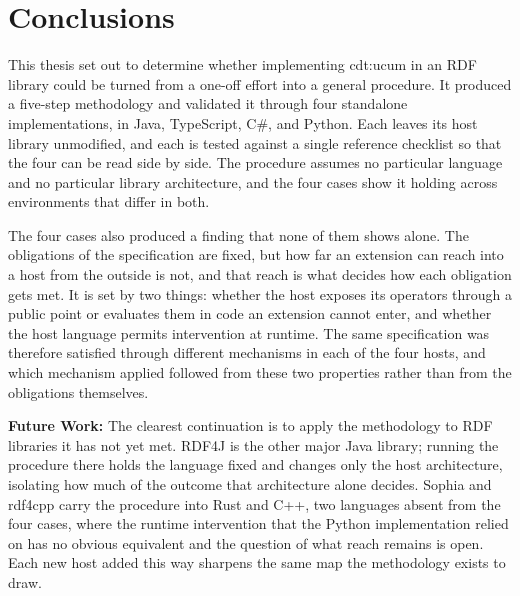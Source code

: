 \chapter{Conclusions}

This thesis set out to determine whether implementing cdt:ucum in an RDF library could be turned from a one-off effort into a general procedure. It produced a five-step methodology and validated it through four standalone implementations, in Java, TypeScript, C\#, and Python. Each leaves its host library unmodified, and each is tested against a single reference checklist so that the four can be read side by side. The procedure assumes no particular language and no particular library architecture, and the four cases show it holding across environments that differ in both.

The four cases also produced a finding that none of them shows alone. The obligations of the specification are fixed, but how far an extension can reach into a host from the outside is not, and that reach is what decides how each obligation gets met. It is set by two things: whether the host exposes its operators through a public point or evaluates them in code an extension cannot enter, and whether the host language permits intervention at runtime. The same specification was therefore satisfied through different mechanisms in each of the four hosts, and which mechanism applied followed from these two properties rather than from the obligations themselves.

\textbf{Future Work: } The clearest continuation is to apply the methodology to RDF libraries it has not yet met. RDF4J is the other major Java library; running the procedure there holds the language fixed and changes only the host architecture, isolating how much of the outcome that architecture alone decides. Sophia and rdf4cpp carry the procedure into Rust and C++, two languages absent from the four cases, where the runtime intervention that the Python implementation relied on has no obvious equivalent and the question of what reach remains is open. Each new host added this way sharpens the same map the methodology exists to draw.